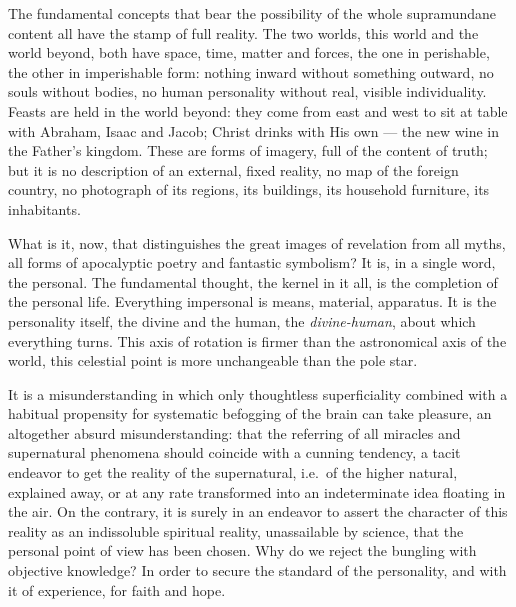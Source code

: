 \documentclass[12pt,a4paper,openany]{book}
\newcommand{\opage}[1]{\marginnote{\footnotesize\textit{[#1]}}}
\begin{document}
The fundamental concepts that bear the possibility of the whole supramundane content all have the stamp of full
reality. The two worlds, this world and the world beyond, both have space, time, matter and forces, the one in
perishable, the other in imperishable form: nothing inward without something outward, no souls without bodies, no
human personality without real, visible individuality. Feasts are held in the world beyond: they come from east and
west to sit at table with Abraham, Isaac and Jacob; Christ drinks with His own --- the new wine in the Father's
kingdom. These are forms of imagery, full of the content of truth; but it is no description of an external, fixed
reality, no map of the foreign country, no
\setcounter{footnote}{0}%
\opage{93}photograph of its regions, its buildings, its household furniture, its inhabitants.

What is it, now, that distinguishes the great images of revelation from all myths, all forms of apocalyptic poetry
and fantastic symbolism? It is, in a single word, the personal. The fundamental thought, the kernel in it all, is the
completion of the personal life. Everything impersonal is means, material, apparatus. It is the personality itself,
the divine and the human, the \emph{divine-human}, about which everything turns. This axis of rotation is firmer than
the astronomical axis of the world, this celestial point is more unchangeable than the pole star.

It is a misunderstanding in which only thoughtless superficiality combined with a habitual propensity for systematic
befogging of the brain can take pleasure, an altogether absurd misunderstanding: that the referring of all miracles and
supernatural phenomena should coincide with a cunning tendency, a tacit endeavor to get the reality of the
supernatural, i.e.\ of the higher natural, explained away, or at any rate transformed into an indeterminate idea
floating in the air. On the contrary, it is surely in an endeavor to assert the character of this reality as an
indissoluble spiritual reality, unassailable by science, that the personal point of view has been chosen. Why do we
reject the bungling with objective knowledge? In order to secure the standard of the personality, and with it of
experience, for faith and hope.
\end{document}

